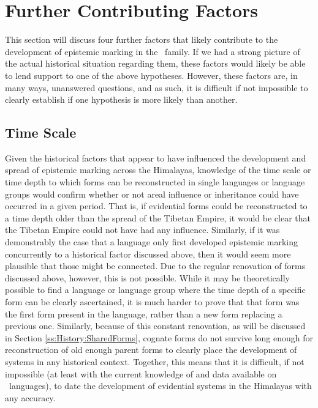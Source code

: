 \section{Further Contributing Factors}\label{s:History:FurtherFactors}
This section will discuss four further factors that likely contribute to the development of epistemic marking in the \lfam\ family. If we had a strong picture of the actual historical situation regarding them, these factors would likely be able to lend support to one of the above hypotheses. However, these factors are, in many ways, unanswered questions, and as such, it is difficult if not impossible to clearly establish if one hypothesis is more likely than another.
\subsection{Time Scale}
Given the historical factors that appear to have influenced the development and spread of epistemic marking across the Himalayas, knowledge of the time scale or time depth to which forms can be reconstructed in single languages or language groups would confirm whether or not areal influence or inheritance could have occurred in a given period. That is, if evidential forms could be reconstructed to a time depth older than the spread of the Tibetan Empire, it would be clear that the Tibetan Empire could not have had any influence. Similarly, if it was demonstrably the case that a language only first developed epistemic marking concurrently to a historical factor discussed above, then it would seem more plausible that those might be connected. Due to the regular renovation of forms discussed above, however, this is not possible. While it may be theoretically possible to find a language or language group where the time depth of a specific form can be clearly ascertained, it is much harder to prove that that form was the first form present in the language, rather than a new form replacing a previous one. Similarly, because of this constant renovation, as will be discussed in Section \ref{ss:History:SharedForms}, cognate forms do not survive long enough for reconstruction of old enough parent forms to clearly place the development of systems in any historical context. Together, this means that it is difficult, if not impossible (at least with the current knowledge of and data available on \lfam\ languages), to date the development of evidential systems in the Himalayas with any accuracy.
